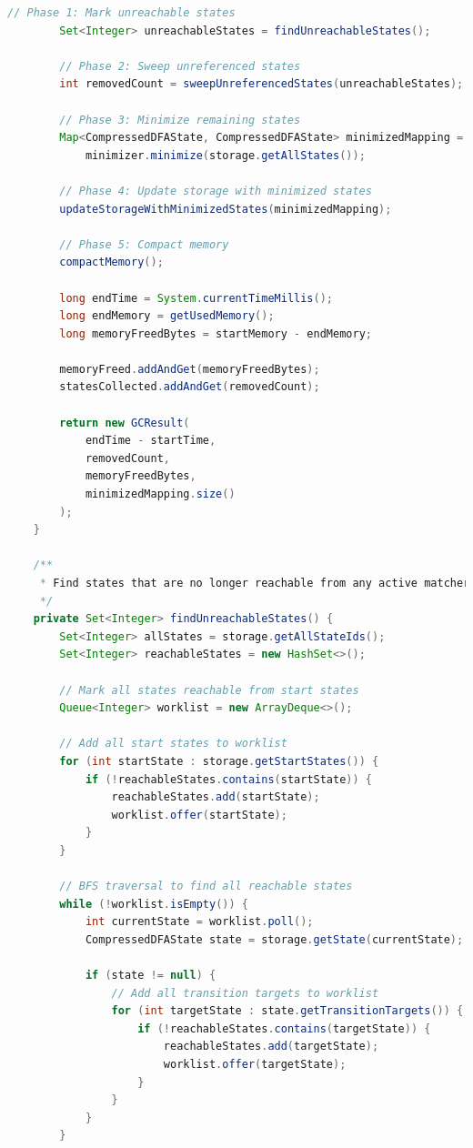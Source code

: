 \documentclass[11pt,a4paper]{article}
\begin{document}
\begin{lstlisting}[language=Java,caption={State Garbage Collection Implementation}]
        // Phase 1: Mark unreachable states
        Set<Integer> unreachableStates = findUnreachableStates();
        
        // Phase 2: Sweep unreferenced states
        int removedCount = sweepUnreferencedStates(unreachableStates);
        
        // Phase 3: Minimize remaining states
        Map<CompressedDFAState, CompressedDFAState> minimizedMapping = 
            minimizer.minimize(storage.getAllStates());
        
        // Phase 4: Update storage with minimized states
        updateStorageWithMinimizedStates(minimizedMapping);
        
        // Phase 5: Compact memory
        compactMemory();
        
        long endTime = System.currentTimeMillis();
        long endMemory = getUsedMemory();
        long memoryFreedBytes = startMemory - endMemory;
        
        memoryFreed.addAndGet(memoryFreedBytes);
        statesCollected.addAndGet(removedCount);
        
        return new GCResult(
            endTime - startTime,
            removedCount,
            memoryFreedBytes,
            minimizedMapping.size()
        );
    }
    
    /**
     * Find states that are no longer reachable from any active matcher.
     */
    private Set<Integer> findUnreachableStates() {
        Set<Integer> allStates = storage.getAllStateIds();
        Set<Integer> reachableStates = new HashSet<>();
        
        // Mark all states reachable from start states
        Queue<Integer> worklist = new ArrayDeque<>();
        
        // Add all start states to worklist
        for (int startState : storage.getStartStates()) {
            if (!reachableStates.contains(startState)) {
                reachableStates.add(startState);
                worklist.offer(startState);
            }
        }
        
        // BFS traversal to find all reachable states
        while (!worklist.isEmpty()) {
            int currentState = worklist.poll();
            CompressedDFAState state = storage.getState(currentState);
            
            if (state != null) {
                // Add all transition targets to worklist
                for (int targetState : state.getTransitionTargets()) {
                    if (!reachableStates.contains(targetState)) {
                        reachableStates.add(targetState);
                        worklist.offer(targetState);
                    }
                }
            }
        }
        

\end{lstlisting}
\end{document}
